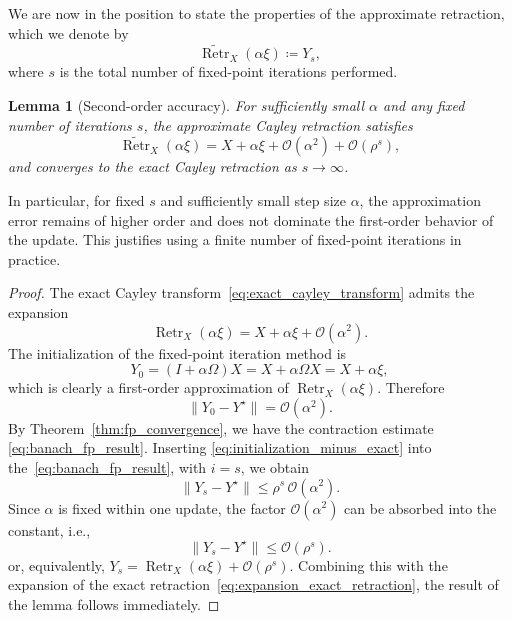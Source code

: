 \documentclass[11pt,a4paper]{article}
\numberwithin{equation}{section}
\let\Omega\varOmega
\newcommand{\cO}{{\mathcal O}}
\theoremstyle{plain}
\newtheorem{lemma}[theorem]{Lemma}
\theoremstyle{definition}
\theoremstyle{remark}
\DeclareMathOperator{\Retraction}{Retr}
\begin{document}
We are now in the position to state the properties of the approximate retraction, which we denote by
\[
    \widetilde{\Retraction}_{X}(\alpha \xi) \coloneqq Y_{s},
\]
where $s$ is the total number of fixed-point iterations performed.

\begin{lemma}[Second-order accuracy] \label{lem:approx_retraction}
    For sufficiently small $\alpha$ and any fixed number of iterations $s$, the approximate Cayley retraction satisfies
    \[
        \widetilde{\Retraction}_X(\alpha \xi) = X + \alpha \xi + \cO(\alpha^{2}) + \cO( \rho^{s} ),
    \]
    and converges to the exact Cayley retraction as $ s \to \infty $.
\end{lemma}

In particular, for fixed $s$ and sufficiently small step size $\alpha$, the approximation error remains of higher order and does not dominate the first-order behavior of the update. This justifies using a finite number of fixed-point iterations in practice.

\begin{proof}
    The exact Cayley transform~\eqref{eq:exact_cayley_transform} admits the expansion
    \begin{equation}\label{eq:expansion_exact_retraction}
        \Retraction_{X}(\alpha \xi) = X + \alpha \xi + \cO(\alpha^{2}).        
    \end{equation}
    The initialization of the fixed-point iteration method is
    \[
        Y_{0} = (I + \alpha \Omega) X = X + \alpha \Omega X = X + \alpha \xi,
    \]
    which is clearly a first-order approximation of $ \Retraction_{X}(\alpha \xi) $. Therefore
    \begin{equation}\label{eq:initialization_minus_exact}
        \| Y_{0} - Y^{\star} \| = \cO(\alpha^{2}).
    \end{equation}
    By Theorem~\ref{thm:fp_convergence}, we have the contraction estimate \eqref{eq:banach_fp_result}. Inserting \eqref{eq:initialization_minus_exact} into the~\eqref{eq:banach_fp_result}, with $ i = s $, we obtain
    \[
        \| Y_{s} - Y^{\star} \| \leq \rho^{s} \, \cO(\alpha^{2}).
    \]
    Since $ \alpha $ is fixed within one update, the factor $ \cO(\alpha^{2}) $ can be absorbed into the constant, i.e.,
    \[
        \| Y_{s} - Y^{\star} \| \leq \cO(\rho^{s}).
    \]
    or, equivalently, $ Y_{s} = \Retraction_{X}(\alpha \xi) + \cO(\rho^{s}) $. Combining this with the expansion of the exact retraction~\eqref{eq:expansion_exact_retraction}, the result of the lemma follows immediately.
\end{proof}
\end{document}
